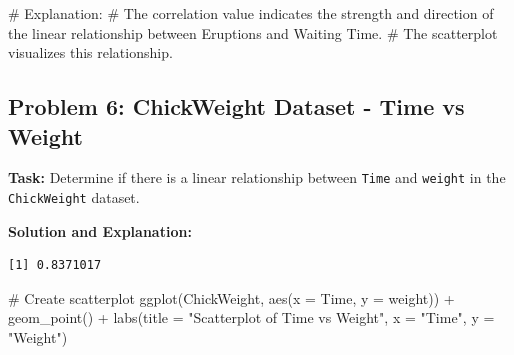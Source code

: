 \documentclass[
  letterpaper,
  DIV=11,
  numbers=noendperiod]{scrreprt}
\newenvironment{Shaded}{\begin{snugshade}}{\end{snugshade}}
\newcommand{\AttributeTok}[1]{\textcolor[rgb]{0.40,0.45,0.13}{#1}}
\newcommand{\CommentTok}[1]{\textcolor[rgb]{0.37,0.37,0.37}{#1}}
\newcommand{\FunctionTok}[1]{\textcolor[rgb]{0.28,0.35,0.67}{#1}}
\newcommand{\NormalTok}[1]{\textcolor[rgb]{0.00,0.23,0.31}{#1}}
\newcommand{\OtherTok}[1]{\textcolor[rgb]{0.00,0.23,0.31}{#1}}
\newcommand{\SpecialCharTok}[1]{\textcolor[rgb]{0.37,0.37,0.37}{#1}}
\newcommand{\StringTok}[1]{\textcolor[rgb]{0.13,0.47,0.30}{#1}}
\begin{document}
\begin{Shaded}
\begin{Highlighting}[]
\CommentTok{\# Explanation:}
\CommentTok{\# The correlation value indicates the strength and direction of the linear relationship between Eruptions and Waiting Time.}
\CommentTok{\# The scatterplot visualizes this relationship.}
\end{Highlighting}
\end{Shaded}

\subsection*{Problem 6: ChickWeight Dataset - Time vs
Weight}\label{problem-6-chickweight-dataset---time-vs-weight}

\textbf{Task:} Determine if there is a linear relationship between
\texttt{Time} and \texttt{weight} in the \texttt{ChickWeight} dataset.

\textbf{Solution and Explanation:}

\begin{Shaded}
\end{Shaded}

\begin{verbatim}
[1] 0.8371017
\end{verbatim}

\begin{Shaded}
\begin{Highlighting}[]
\CommentTok{\# Create scatterplot}
\FunctionTok{ggplot}\NormalTok{(ChickWeight, }\FunctionTok{aes}\NormalTok{(}\AttributeTok{x =}\NormalTok{ Time, }\AttributeTok{y =}\NormalTok{ weight)) }\SpecialCharTok{+}
  \FunctionTok{geom\_point}\NormalTok{() }\SpecialCharTok{+}
  \FunctionTok{labs}\NormalTok{(}\AttributeTok{title =} \StringTok{"Scatterplot of Time vs Weight"}\NormalTok{, }\AttributeTok{x =} \StringTok{"Time"}\NormalTok{, }\AttributeTok{y =} \StringTok{"Weight"}\NormalTok{)}
\end{Highlighting}
\end{Shaded}
\end{document}
